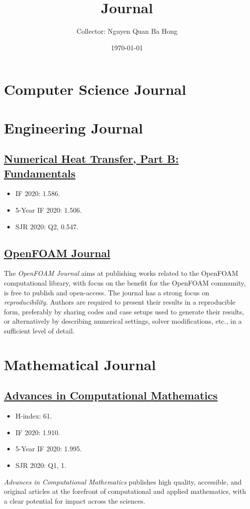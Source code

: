 \documentclass{article}
\title{Journal}
\author{Collector: Nguyen Quan Ba Hong}
\date{\today}
\numberwithin{equation}{section}
\begin{document}
\maketitle
\tableofcontents


\section{Computer Science Journal}

\section{Engineering Journal}

\subsection{\href{https://www.tandfonline.com/journals/unhb20}{Numerical Heat Transfer, Part B: Fundamentals}}
\begin{itemize}
	\item IF 2020: 1.586.
	\item 5-Year IF 2020: 1.506.
	\item SJR 2020: Q2, 0.547.
\end{itemize}

\subsection{\href{https://journal.openfoam.com/index.php/ofj}{OpenFOAM Journal}}
The \textit{OpenFOAM Journal} aims at publishing works related to the OpenFOAM computational library, with focus on the benefit for the OpenFOAM community, is free to publish and open-access. The journal has a strong focus on \textit{reproducibility}. Authors are required to present their results in a reproducible form, preferably by sharing codes and case setups used to generate their results, or alternatively by describing numerical settings, solver modifications, etc., in a sufficient level of detail.

\section{Mathematical Journal}

\subsection{\href{https://www.springer.com/journal/10444}{Advances in Computational Mathematics}}
\begin{itemize}
	\item H-index: 61.
	\item IF 2020: 1.910.
	\item 5-Year IF 2020: 1.995.
	\item SJR 2020: Q1, 1.
\end{itemize}
\textit{Advances in Computational Mathematics} publishes high quality, accessible, and original articles at the forefront of computational and applied mathematics, with a clear potential for impact across the sciences.
\end{document}
